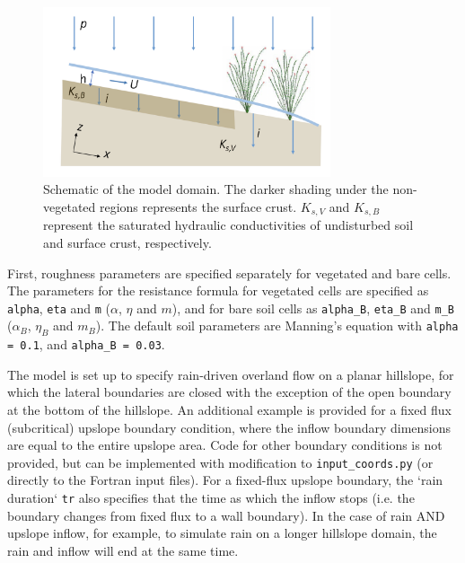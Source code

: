 \documentclass{article}
\newcommand{\code}[1]{\texttt{#1}}
\begin{document}
 \begin{figure}[h]
 \centering
\includegraphics[width=20pc]{grid/domain_schematic.png}
 \caption{Schematic of the model domain.  The darker shading under the non-vegetated regions represents the surface crust.  $K_{s,V}$ and $K_{s,B}$  represent the saturated hydraulic conductivities of undisturbed soil and surface crust, respectively.}
 \label{domain_schematic}
 \end{figure}
 
 
First,  roughness parameters are specified separately for vegetated and bare cells. 
 The parameters for the resistance formula for vegetated cells are specified as  \code{alpha}, \code{eta} and \code{m}  ($\alpha$, $\eta$ and $m$), and for bare soil cells as  \code{alpha\_B}, \code{eta\_B} and \code{m\_B}  ($\alpha_B$, $\eta_B$ and $m_B$).
  The default soil parameters are Manning's equation with \code{alpha = 0.1}, and \code{alpha\_B = 0.03}.


The model is set up to specify rain-driven overland flow on a planar hillslope, for which the lateral boundaries are closed with the exception of the open boundary at the bottom of the hillslope.  An additional example  is provided for a fixed flux (subcritical) upslope boundary condition,  where the inflow boundary dimensions are equal to the entire upslope area.  Code for other boundary conditions is not provided, but can be implemented with modification to \code{input\_coords.py} (or directly to the Fortran input files).
For a fixed-flux upslope boundary, the `rain duration` \code{tr} also specifies that the time as which the inflow stops (i.e. the boundary changes from fixed flux to a wall boundary).  In the case of rain AND upslope inflow, for example, to simulate rain on a longer hillslope domain, the rain and inflow will end at the same time. 
\end{document}
